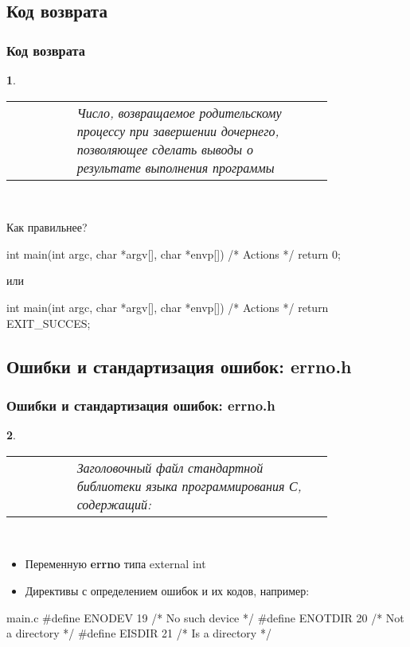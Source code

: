 \documentclass[10pt,pdf,hyperref={unicode}]{beamer}
\newtheorem*{inner}{\innerheader}
\newcommand{\innerheader}{}
\newenvironment{defi}[1]{
		\renewcommand\innerheader{\textbf{#1}}
		\begin{inner}
		\\[0.3em]
		\begin{tabular}{p{0.5cm\linewidth}p{0.8\linewidth}}
		 & \normalfont
		}
		{
		\end{tabular}
		\\
		\end{inner}
		}
\begin{document}
	\subsection{Код возврата}
	\begin{frame}[fragile]
	
		\frametitle{Код возврата}
		
		\begin{defi}{Код возврата}
		Число, возвращаемое родительскому процессу при завершении дочернего, позволяющее сделать выводы о результате выполнения программы

		\end{defi}
		
		Как правильнее?
				
		\begin{CCode}{}
			int main(int argc, char *argv[], char *envp[]) { 
 				/* Actions */
 				return 0; 
			} \end{CCode}
		
		или
		
		\begin{CCode}{}
		int main(int argc, char *argv[], char *envp[]) { 
 				/* Actions */
 				return EXIT_SUCCES; 
			} \end{CCode}
		
	\end{frame}
	
	\subsection{Ошибки и стандартизация ошибок: errno.h}
	\begin{frame}[fragile]
	
		\frametitle{Ошибки и стандартизация ошибок: errno.h}
		
		\begin{defi}{errno.h}
		 Заголовочный файл стандартной библиотеки языка программирования С, содержащий: 
		\end{defi}
		
		\begin{itemize}
			\item Переменную \textbf{errno} типа external int
			\item Директивы с определением ошибок и их кодов, например:	
		\end{itemize}
		
		\begin{CCode}{main.c}
			#define ENODEV   19  /* No such device */
			#define ENOTDIR  20  /* Not a directory */
			#define EISDIR   21  /* Is a directory */  \end{CCode}
		
	\end{frame}
	
\end{document}
